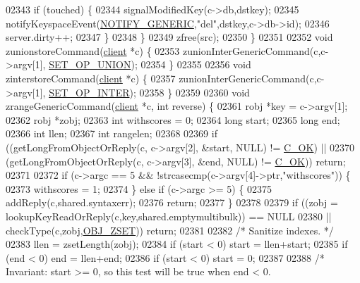 \begin{DoxyCode}
02343         \textcolor{keywordflow}{if} (touched) \{
02344             signalModifiedKey(c->db,dstkey);
02345             notifyKeyspaceEvent(\hyperlink{server_8h_a9fa53dd1068e62365f3964ad3479eec2}{NOTIFY\_GENERIC},\textcolor{stringliteral}{"del"},dstkey,c->db->id);
02346             server.dirty++;
02347         \}
02348     \}
02349     zfree(src);
02350 \}
02351 
02352 \textcolor{keywordtype}{void} zunionstoreCommand(\hyperlink{structclient}{client} *c) \{
02353     zunionInterGenericCommand(c,c->argv[1], \hyperlink{server_8h_af00a414b6d78bff8b325eb9cf82c3edb}{SET\_OP\_UNION});
02354 \}
02355 
02356 \textcolor{keywordtype}{void} zinterstoreCommand(\hyperlink{structclient}{client} *c) \{
02357     zunionInterGenericCommand(c,c->argv[1], \hyperlink{server_8h_af089a3b4de4c69fa5d3c7f5ae0d94008}{SET\_OP\_INTER});
02358 \}
02359 
02360 \textcolor{keywordtype}{void} zrangeGenericCommand(\hyperlink{structclient}{client} *c, \textcolor{keywordtype}{int} reverse) \{
02361     robj *key = c->argv[1];
02362     robj *zobj;
02363     \textcolor{keywordtype}{int} withscores = 0;
02364     \textcolor{keywordtype}{long} start;
02365     \textcolor{keywordtype}{long} end;
02366     \textcolor{keywordtype}{int} llen;
02367     \textcolor{keywordtype}{int} rangelen;
02368 
02369     \textcolor{keywordflow}{if} ((getLongFromObjectOrReply(c, c->argv[2], &start, NULL) != \hyperlink{server_8h_a303769ef1065076e68731584e758d3e1}{C\_OK}) ||
02370         (getLongFromObjectOrReply(c, c->argv[3], &end, NULL) != \hyperlink{server_8h_a303769ef1065076e68731584e758d3e1}{C\_OK})) \textcolor{keywordflow}{return};
02371 
02372     \textcolor{keywordflow}{if} (c->argc == 5 && !strcasecmp(c->argv[4]->ptr,\textcolor{stringliteral}{"withscores"})) \{
02373         withscores = 1;
02374     \} \textcolor{keywordflow}{else} \textcolor{keywordflow}{if} (c->argc >= 5) \{
02375         addReply(c,shared.syntaxerr);
02376         \textcolor{keywordflow}{return};
02377     \}
02378 
02379     \textcolor{keywordflow}{if} ((zobj = lookupKeyReadOrReply(c,key,shared.emptymultibulk)) == NULL
02380          || checkType(c,zobj,\hyperlink{server_8h_a8c356422ddbc03bd77694880a30a1953}{OBJ\_ZSET})) \textcolor{keywordflow}{return};
02381 
02382     \textcolor{comment}{/* Sanitize indexes. */}
02383     llen = zsetLength(zobj);
02384     \textcolor{keywordflow}{if} (start < 0) start = llen+start;
02385     \textcolor{keywordflow}{if} (end < 0) end = llen+end;
02386     \textcolor{keywordflow}{if} (start < 0) start = 0;
02387 
02388     \textcolor{comment}{/* Invariant: start >= 0, so this test will be true when end < 0.}

\end{DoxyCode}
